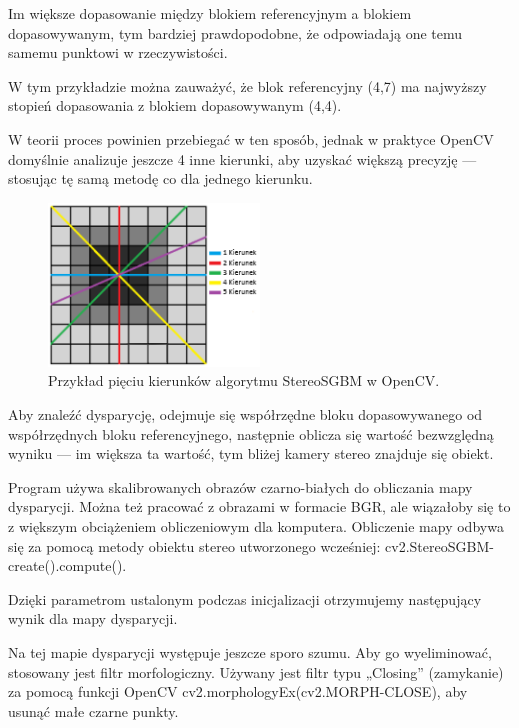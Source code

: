 \documentclass[magisterska]{pracadypl}
\begin{document}
Im większe dopasowanie między blokiem referencyjnym a blokiem dopasowywanym, tym bardziej prawdopodobne, że odpowiadają one temu samemu punktowi w rzeczywistości.

W tym przykładzie można zauważyć, że blok referencyjny (4,7) ma najwyższy stopień dopasowania z blokiem dopasowywanym (4,4).

W teorii proces powinien przebiegać w ten sposób, jednak w praktyce OpenCV domyślnie analizuje jeszcze 4 inne kierunki, aby uzyskać większą precyzję — stosując tę samą metodę co dla jednego kierunku.

\begin{figure}[H]  %
    \centering  %
    \includegraphics[width=0.5\textwidth]{images/dopracy2.png}  %
    \captionsetup{font=footnotesize}
    \caption[Przykład pięciu kierunków algorytmu StereoSGBM w OpenCV. Opracowanie własne. ]{Przykład pięciu kierunków algorytmu StereoSGBM w OpenCV.}
\end{figure}

Aby znaleźć dysparycję, odejmuje się współrzędne bloku dopasowywanego od współrzędnych bloku referencyjnego, następnie oblicza się wartość bezwzględną wyniku — im większa ta wartość, tym bliżej kamery stereo znajduje się obiekt.

Program używa skalibrowanych obrazów czarno-białych do obliczania mapy dysparycji. Można też pracować z obrazami w formacie BGR, ale wiązałoby się to z większym obciążeniem obliczeniowym dla komputera. Obliczenie mapy odbywa się za pomocą metody obiektu stereo utworzonego wcześniej: cv2.StereoSGBM-create().compute().

Dzięki parametrom ustalonym podczas inicjalizacji otrzymujemy następujący wynik dla mapy dysparycji.

Na tej mapie dysparycji występuje jeszcze sporo szumu. Aby go wyeliminować, stosowany jest filtr morfologiczny. Używany jest filtr typu „Closing” (zamykanie) za pomocą funkcji OpenCV cv2.morphologyEx(cv2.MORPH-CLOSE), aby usunąć małe czarne punkty.
\end{document}
